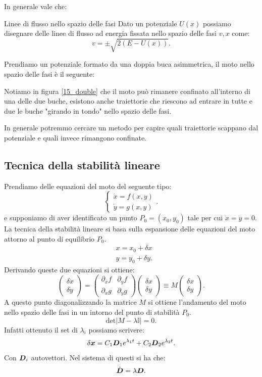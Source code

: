 \noindent
In generale vale che:
\begin{redbox}{Linee di flusso nello spazio delle fasi}
    Dato un potenziale $U(x)$ possiamo disegnare delle linee di flusso ad energia fissata nello spazio delle fasi $v,x$ come:
    \[
	v = \pm \sqrt{2(E-U(x))} 
    .\] 
\end{redbox}
\noindent
\begin{exmp}
Prendiamo un potenziale formato da una doppia buca asimmetrica, il moto nello spazio delle fasi è il seguente:    

Notiamo in figura \ref{15_double} che il moto può rimanere confinato all'interno di una delle due buche, esistono anche traiettorie che riescono ad entrare in tutte e due le buche "girando in tondo" nello spazio delle fasi. 
\end{exmp}
\noindent
In generale potremmo cercare un metodo per capire quali traiettorie scappano dal potenziale e quali invece rimangono confinate.
\subsection{Tecnica della stabilità lineare}%
\label{sub:Tecnica della stabilità lineare}
Prendiamo delle equazioni del moto del seguente tipo:
\[
    \begin{cases}
	\dot{x} = f(x, y) \\
	\dot{y} = g(x,y) 
    \end{cases}
.\] 
e supponiamo di aver identificato un punto $P_0=(x_0, y_0)$ tale per cui $\dot{x}=\dot{y}=0$.\\
La tecnica della stabilità lineare si basa sulla espansione delle equazioni del moto attorno al punto di equilibrio $P_0$.
\[\begin{aligned}
    & x = x_0 + \delta x\\
    & y = y_0 + \delta y
.\end{aligned}\]
Derivando queste due equazioni si ottiene: 
\[
    \begin{pmatrix} \delta\dot{x} \\ \delta\dot{y} \end{pmatrix} =
    \begin{pmatrix} 
	\partial_{x}f & \partial_{y}f\\
	\partial_{x}g & \partial_{y}g
    \end{pmatrix} 
    \begin{pmatrix} \delta x \\ \delta y \end{pmatrix} 
    \equiv 
    M 
    \begin{pmatrix} \delta x \\ \delta y \end{pmatrix} 
.\] 
A questo punto diagonalizzando la matrice $M$ si ottiene l'andamento del moto nello spazio delle fasi in un intorno del punto di stabilità $P_0$.
\[
    \text{det}\left|M-\lambda\mathbb{I}\right|=0
.\] 
Infatti ottenuto il set di $\lambda_i$ possiamo scrivere:
\[
    \delta \boldsymbol{x} = C_1\boldsymbol{D}_1e^{\lambda_1t} + C_2\boldsymbol{D}_2e^{\lambda_2t}
.\] 
Con $\boldsymbol{D}_i$ autovettori. Nel sistema di questi si ha che:
\[
    \dot{\boldsymbol{D}}  = \lambda  \boldsymbol{D}
.\] 
